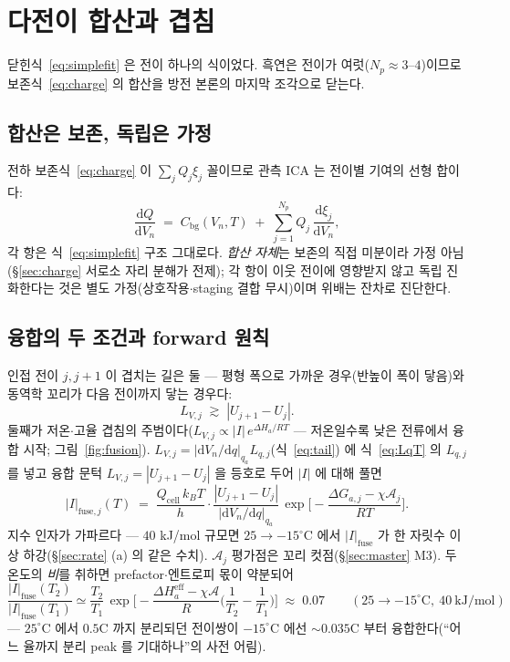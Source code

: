 \documentclass[11pt,a4paper]{article}
\newcommand{\dd}{\mathrm{d}}
\newcommand{\eff}{\mathrm{eff}}
\newcommand{\cell}{\mathrm{cell}}
\newcommand{\bg}{\mathrm{bg}}
\begin{document}
\section{다전이 합산과 겹침}\label{sec:overlap}
닫힌식~\eqref{eq:simplefit} 은 전이 하나의 식이었다. 흑연은 전이가 여럿($N_p\approx3$--$4$)이므로 보존식~\eqref{eq:charge} 의 합산을 방전 본론의 마지막 조각으로 닫는다.

\subsection{합산은 보존, 독립은 가정}
전하 보존식~\eqref{eq:charge} 이 $\sum_jQ_j\xi_j$ 꼴이므로 관측 ICA 는 전이별 기여의 선형 합이다:
\begin{equation}
\frac{\dd Q}{\dd V_n}\;=\;C_\bg(V_n,T)\;+\;\sum_{j=1}^{N_p}Q_j\,\frac{\dd\xi_j}{\dd V_n},
\label{eq:total}
\end{equation}
각 항은 식~\eqref{eq:simplefit} 구조 그대로다. \emph{합산 자체}는 보존의 직접 미분이라 가정 아님(\S\ref{sec:charge} 서로소 자리 분해가 전제); 각 항이 이웃 전이에 영향받지 않고 독립 진화한다는 것은 별도 가정(상호작용$\cdot$staging 결합 무시)이며 위배는 잔차로 진단한다.

\subsection{융합의 두 조건과 forward 원칙}
인접 전이 $j,j{+}1$ 이 겹치는 길은 둘 — 평형 폭으로 가까운 경우(반높이 폭이 닿음)와 동역학 꼬리가 다음 전이까지 닿는 경우다:
\begin{equation*}
L_{V,j}\;\gtrsim\;|U_{j+1}-U_j|.
\end{equation*}
둘째가 저온$\cdot$고율 겹침의 주범이다($L_{V,j}\propto|I|\,e^{\Delta H_a/RT}$ — 저온일수록 낮은 전류에서 융합 시작; 그림~\ref{fig:fusion}). $L_{V,j}=|\dd V_n/\dd q|_{q_a}L_{q,j}$(식~\eqref{eq:tail}) 에 식~\eqref{eq:LqT} 의 $L_{q,j}$ 를 넣고 융합 문턱 $L_{V,j}=|U_{j+1}-U_j|$ 을 등호로 두어 $|I|$ 에 대해 풀면
\begin{equation}
|I|_{\text{fuse},j}(T)\;=\;\frac{Q_\cell\,k_BT}{h}\cdot
\frac{|U_{j+1}-U_j|}{|\dd V_n/\dd q|_{q_a}}\,
\exp\!\Big[-\frac{\Delta G_{a,j}-\chi\mathcal A_j}{RT}\Big].
\label{eq:Ifuse}
\end{equation}
지수 인자가 가파르다 — $40$ kJ/mol 규모면 $25\to-15^\circ$C 에서 $|I|_{\text{fuse}}$ 가 한 자릿수 이상 하강(\S\ref{sec:rate} (a) 의 같은 수치). $\mathcal A_j$ 평가점은 꼬리 컷점(\S\ref{sec:master} M3). 두 온도의 \emph{비}를 취하면 prefactor$\cdot$엔트로피 몫이 약분되어
\begin{equation*}
\frac{|I|_{\text{fuse}}(T_2)}{|I|_{\text{fuse}}(T_1)}
\simeq\frac{T_2}{T_1}\,
\exp\!\Big[-\frac{\Delta H_a^{\eff}-\chi\mathcal A}{R}\Big(\frac1{T_2}-\frac1{T_1}\Big)\Big]
\;\approx\;0.07\qquad(25\to-15^\circ\mathrm C,\ 40\ \mathrm{kJ/mol})
\end{equation*}
— $25^\circ$C 에서 $0.5$C 까지 분리되던 전이쌍이 $-15^\circ$C 에선 $\sim0.035$C 부터 융합한다(``어느 율까지 분리 peak 를 기대하나''의 사전 어림).
\end{document}
